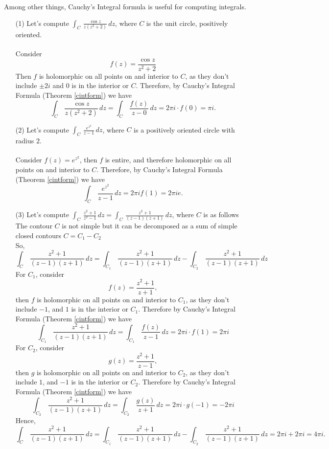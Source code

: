 \vspace*{1em}

Among other things, Cauchy's Integral formula is useful for computing integrals. 
\begin{example}\hfill
\begin{itemize}[itemsep=2em]
\item[(1)] Let's compute $\displaystyle \int_C\, \frac{\cos z}{z(z^2 + 2)}\, dz$, where $C$ is the unit circle, positively oriented.\\
\\
Consider
\[f(z) = \frac{\cos z}{z^2 + 2}\]
Then $f$ is holomorphic on all points on and interior to $C$, as they don't include $\pm 2i$ and $0$ is in the interior or $C$. Therefore, by Cauchy's Integral Formula (Theorem \ref{cintform}) we have
\[\int_C\, \frac{\cos z}{z(z^2 + 2)}\, dz = \int_C\, \frac{f(z)}{z - 0}\, dz = 2\pi i\cdot f(0) = \pi i.\]

\item[(2)] Let's compute $\displaystyle \int_C\, \frac{e^{z^2}}{z - 1}\, dz$, where $C$ is a positively oriented circle with radius $2$.\\
\\
Consider $f(z) = e^{z^2}$, then $f$ is entire, and therefore holomorphic on all points on and interior to $C$. Therefore, by Cauchy's Integral Formula (Theorem \ref{cintform}) we have
\[\int_C\, \frac{e^{z^2}}{z - 1}\, dz = 2\pi if(1) = 2\pi ie.\]

\item[(3)] Let's compute $\displaystyle \int_C\, \frac{z^2 + 1}{z^2 - 1}\, dz = \int_C\, \frac{z^2 + 1}{(z - 1)(z + 1)}\, dz$, where $C$ is as follows
\[\]
The contour $C$ is not simple but it can be decomposed as a sum of simple closed contours $C = C_1 - C_2$
\[\]
So, 
\[\int_C\, \frac{z^2 + 1}{(z - 1)(z + 1)}\,dz = \int_{C_1}\, \frac{z^2 + 1}{(z - 1)(z + 1)}\,dz - \int_{C_2}\, \frac{z^2 + 1}{(z - 1)(z + 1)}\,dz\]
For $C_1$, consider
\[f(z) = \frac{z^2 + 1}{z + 1},\]
then $f$ is holomorphic on all points on and interior to $C_1$, as they don't include $-1$, and $1$ is in the interior or $C_1$. Therefore by Cauchy's Integral Formula (Theorem \ref{cintform}) we have
\[\int_{C_1}\, \frac{z^2 + 1}{(z - 1)(z + 1)}\,dz = \int_{C_1}\, \frac{f(z)}{z - 1}\,dz = 2\pi i\cdot f(1) = 2\pi i\]
For $C_2$, consider
\[g(z) = \frac{z^2 + 1}{z - 1},\]
then $g$ is holomorphic on all points on and interior to $C_2$, as they don't include $1$, and $-1$ is in the interior or $C_2$. Therefore by Cauchy's Integral Formula (Theorem \ref{cintform}) we have
\[\int_{C_2}\, \frac{z^2 + 1}{(z - 1)(z + 1)}\,dz = \int_{C_2}\, \frac{g(z)}{z + 1}\,dz = 2\pi i\cdot g(-1) = -2\pi i\]
Hence, 
\[\int_C\, \frac{z^2 + 1}{(z - 1)(z + 1)}\,dz = \int_{C_1}\, \frac{z^2 + 1}{(z - 1)(z + 1)}\,dz - \int_{C_2}\, \frac{z^2 + 1}{(z - 1)(z + 1)}\,dz = 2\pi i + 2\pi i = 4\pi i.\]
\end{itemize}
\end{example}

